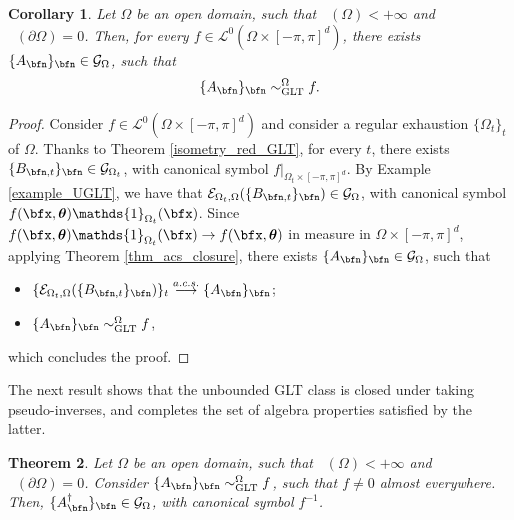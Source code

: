 \documentclass{amsart}
\newtheorem{thm}{Theorem}[section]
\newtheorem{cor}[thm]{Corollary}
\DeclareMathOperator{\Ld}{\mathcal{L}^d}
\newcommand{\bftheta}{{\boldsymbol\theta}}
\begin{document}
\begin{cor}\label{cor_UGLT_surj}
    Let $\Omega$ be an open domain, such that $\Ld(\Omega)<+\infty$ and $\Ld(\partial\Omega)=0$. Then, for every $f\in\mathcal{L}^0(\Omega\times[-\pi,\pi]^d)$, there exists $\{A_\bfn\}_\bfn\in\mathcal{G}_\Omega$, such that
    \begin{equation*}
        \{A_\bfn\}_\bfn\sim_{\mathrm{GLT}}^{\Omega}f.
    \end{equation*}
\end{cor}
\begin{proof}
    Consider $f\in\mathcal{L}^{0}(\Omega\times[-\pi,\pi]^d)$ and consider a regular exhaustion $\{\Omega_t\}_t$ of $\Omega$. Thanks to Theorem \ref{isometry_red_GLT}, for every $t$, there exists $\{B_{\bfn,t}\}_\bfn\in\mathcal{G}_{\Omega_t}$, with canonical symbol $f|_{\Omega_t\times[-\pi,\pi]^d}$. By Example \ref{example_UGLT}, we have that $\mathcal{E}_{\Omega_t,\Omega}(\{B_{\bfn,t}\}_\bfn)\in\mathcal{G}_{\Omega}$, with canonical symbol $f(\bfx,\bftheta)\mathds{1}_{\Omega_t}(\bfx)$. Since $f(\bfx,\bftheta)\mathds{1}_{\Omega_t}(\bfx)\to f(\bfx,\bftheta)$ in measure in $\Omega \times [-\pi,\pi]^d$, applying Theorem \ref{thm_acs_closure}, there exists $\{A_\bfn\}_\bfn\in\mathcal{G}_\Omega$, such that 
    \begin{itemize}
        \item $\{\mathcal{E}_{\Omega_t,\Omega}(\{B_{\bfn,t}\}_\bfn)\}_t\overset{a.c.s.}{\longrightarrow}\{A_\bfn\}_\bfn$;
        \item $\{A_\bfn\}_\bfn\sim_{\mathrm{GLT}}^{\Omega}f$,
    \end{itemize}
    which concludes the proof.
\end{proof}
The next result shows that the unbounded GLT class is closed under taking pseudo-inverses, and completes the set of algebra properties satisfied by the latter.
\begin{thm}\label{uGLT_isometry}
Let $\Omega$ be an open domain, such that $\Ld(\Omega)<+\infty$ and $\Ld(\partial\Omega)=0$. Consider $\{A_\bfn\}_\bfn\sim_{\mathrm{GLT}}^{\Omega}f$, such that $f\neq 0$ almost everywhere. Then, $\{A_\bfn^{\dagger}\}_\bfn\in\mathcal{G}_\Omega$, with canonical symbol $f^{-1}$. 
\end{thm}
\end{document}
